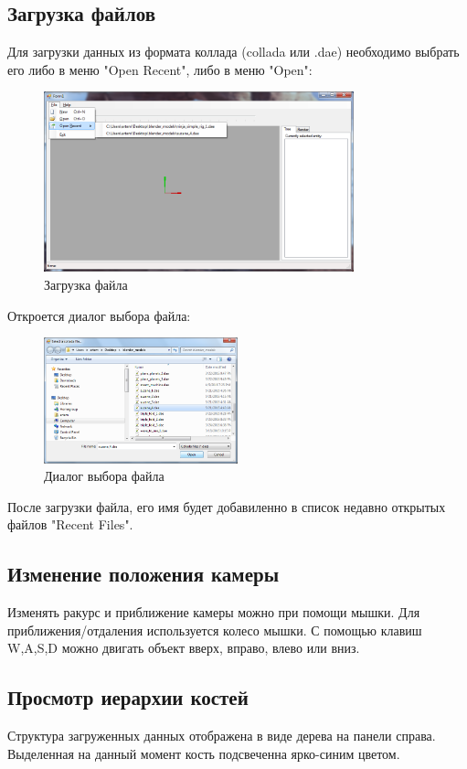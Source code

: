 \subsection{Загрузка файлов}
Для загрузки данных из формата коллада (collada или .dae) необходимо выбрать его либо в меню "Open Recent", либо в меню "Open":

\begin{figure}[h!]
    \centering
    \includegraphics[width=0.8\textwidth]{../screenshots/file_menu_with_recent.png}
    \caption{Загрузка файла}
\end{figure}

Откроется диалог выбора файла:
\begin{figure}[h!]
    \centering
    \includegraphics[width=0.5\textwidth]{../screenshots/open_file_dialog.png}
    \caption{Диалог выбора файла}
\end{figure}

После загрузки файла, его имя будет добавиленно в список недавно открытых файлов "Recent Files".

\subsection{Изменение положения камеры}
Изменять ракурс и приближение камеры можно при помощи мышки. Для приближения/отдаления используется колесо мышки. С помощью клавиш W,A,S,D можно двигать объект вверх, вправо, влево или вниз.

\subsection{Просмотр иерархии костей}
Структура загруженных данных отображена в виде дерева на панели справа. Выделенная на данный момент кость подсвеченна ярко-синим цветом.

